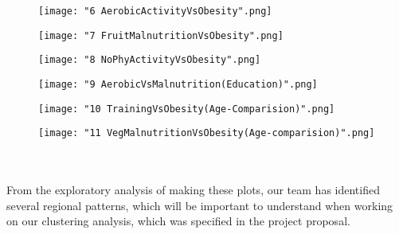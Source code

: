 \documentclass{article}
\begin{document}
		\begin{figure}[h]
			\centering
			\caption{}
			\texttt{[image: "6 AerobicActivityVsObesity".png]}
			\label{fig:aerobicActivityVsObesity}
		\end{figure}
		\begin{figure}[h]
			\centering
			\caption{}
			\texttt{[image: "7 FruitMalnutritionVsObesity".png]}
			\label{fig:fruitMalnutritionVsObesity}
		\end{figure}
		\begin{figure}[h]
			\centering
			\caption{}
			\texttt{[image: "8 NoPhyActivityVsObesity".png]}
			\label{fig:noPhyActivityVsObesity}
		\end{figure}
		\begin{figure}[h]
			\centering
			\caption{}
			\texttt{[image: "9 AerobicVsMalnutrition(Education)".png]}
			\label{fig:aerobicVsMalnutrition}
		\end{figure}
		\begin{figure}[h]
			\centering
			\caption{}
			\texttt{[image: "10 TrainingVsObesity(Age-Comparision)".png]}
			\label{fig:trainingVsObesity}
		\end{figure}
		\begin{figure}[h]
			\centering
			\caption{}
			\texttt{[image: "11 VegMalnutritionVsObesity(Age-comparision)".png]}
			\label{fig:vegMalnutritionVsObesity}
		\end{figure}
		\\\\
		From the exploratory analysis of making these plots, our team has identified several regional patterns, which will be important to understand when working on our clustering analysis, which was specified in the project proposal.
		
	
\end{document}
